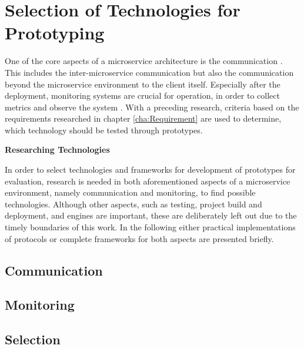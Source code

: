 \chapter{Selection of Technologies for Prototyping}\label{cha:Technologies}

One of the core aspects of a microservice architecture is the communication \cite[p.~60]{Bruce.2019}.
This includes the inter-microservice communication but also the communication beyond the microservice environment to the client itself.
Especially after the deployment, monitoring systems are crucial for operation, in order to collect metrics and observe the system \cite[p.~313]{Bruce.2019}.
With a preceding research, criteria based on the requirements researched in chapter \ref{cha:Requirement} are used to determine, which technology should be tested through prototypes.

\textbf{Researching Technologies}

In order to select technologies and frameworks for development of prototypes for evaluation, research is needed in both aforementioned aspects of a microservice environment, namely communication and monitoring, to find possible technologies.
Although other aspects, such as testing, project build and deployment, and engines are important, these are deliberately left out due to the timely boundaries of this work.
In the following either practical implementations of protocols or complete frameworks for both aspects are presented briefly.

\section{Communication}\label{cha:Technologies:communication}

\pagebreak
\section{Monitoring}\label{cha:Technologies:monitoring}

\pagebreak
\section{Selection}\label{cha:Technologies:selection}
